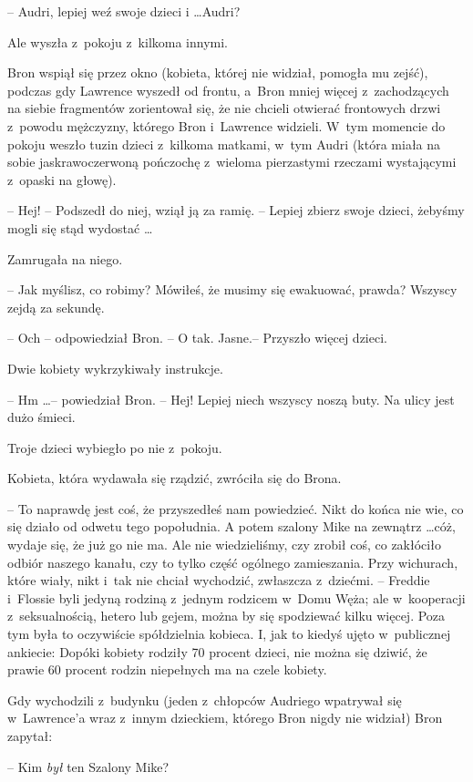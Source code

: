 \documentclass[oneside,polish,11pt,rmheadings]{mwbk}
\begin{document}
-- Audri, lepiej weź swoje dzieci i \ldots  Audri? 

Ale wyszła z~pokoju z~kilkoma innymi. 

Bron wspiął się przez okno (kobieta, której nie widział, pomogła mu zejść), podczas gdy Lawrence wyszedł od frontu, a~Bron mniej więcej z~zachodzących na siebie fragmentów zorientował się, że nie chcieli otwierać frontowych drzwi z~powodu mężczyzny, którego Bron i~Lawrence widzieli. W~tym momencie do pokoju weszło tuzin dzieci z~kilkoma matkami, w~tym Audri (która miała na sobie jaskrawoczerwoną pończochę z~wieloma pierzastymi rzeczami wystającymi z~opaski na głowę). 

-- Hej! --  Podszedł do niej, wziął ją za ramię. -- Lepiej zbierz swoje dzieci, żebyśmy mogli się stąd wydostać \ldots  

Zamrugała na niego.

-- Jak myślisz, co robimy? Mówiłeś, że musimy się ewakuować, prawda? Wszyscy zejdą za sekundę. 

-- Och -- odpowiedział Bron. -- O tak. Jasne.--  Przyszło więcej dzieci. 

Dwie kobiety wykrzykiwały instrukcje. 

-- Hm \ldots  -- powiedział Bron. -- Hej! Lepiej niech wszyscy noszą buty. Na ulicy jest dużo śmieci. 

Troje dzieci wybiegło po nie z~pokoju. 

Kobieta, która wydawała się rządzić, zwróciła się do Brona. 

-- To naprawdę jest coś, że przyszedłeś nam powiedzieć. Nikt do końca nie wie, co się działo od odwetu tego popołudnia. A potem szalony Mike na zewnątrz \ldots  cóż, wydaje się, że już go nie ma. Ale nie wiedzieliśmy, czy zrobił coś, co zakłóciło odbiór naszego kanału, czy to tylko część ogólnego zamieszania. Przy wichurach, które wiały, nikt i~tak nie chciał wychodzić, zwłaszcza z~dziećmi. -- Freddie i~Flossie byli jedyną rodziną z~jednym rodzicem w~Domu Węża; ale w~kooperacji z~seksualnością, hetero lub gejem, można by się spodziewać kilku więcej. Poza tym była to oczywiście spółdzielnia kobieca. I, jak to kiedyś ujęto w~publicznej ankiecie: Dopóki kobiety rodziły 70 procent dzieci, nie można się dziwić, że prawie 60 procent rodzin niepełnych ma na czele kobiety. 

Gdy wychodzili z~budynku (jeden z~chłopców Audriego wpatrywał się w~Lawrence'a wraz z~innym dzieckiem, którego Bron nigdy nie widział) Bron zapytał: 

-- Kim \textit{był }ten Szalony Mike? 
\end{document}
